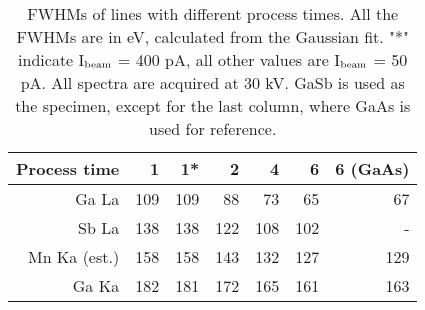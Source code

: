 \begin{table}[hbtp]
    \begin{center}
        \caption{
            FWHMs of lines with different process times.
            All the FWHMs are in eV, calculated from the Gaussian fit.
            "*" indicate I$_\textnormal{beam}$ = 400 pA, all other values are I$_\textnormal{beam}$ = 50 pA.
            All spectra are acquired at 30 kV.
            GaSb is used as the specimen, except for the last column, where GaAs is used for reference.
        }
        \renewcommand*{\arraystretch}{1.4}
        \label{tab:results:PTvsFWHMs}
        \begin{tabular}{rrrrrrr}
            \hline
            \textbf{	Process time	} & \textbf{	1	} & \textbf{	1*	} & \textbf{	2	} & \textbf{	4	} & \textbf{	6	} & \textbf{	6 (GaAs)	} \\
            \hline
            Ga La                   & 109          & 109           & 88           & 73           & 65           & 67                \\
            Sb La                   & 138          & 138           & 122          & 108          & 102          & -                 \\
            Mn Ka (est.)            & 158          & 158           & 143          & 132          & 127          & 129               \\
            Ga Ka                   & 182          & 181           & 172          & 165          & 161          & 163               \\
            \hline
        \end{tabular}
    \end{center}
\end{table}

